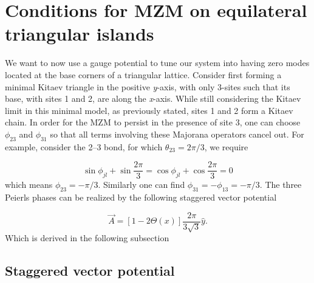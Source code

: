 \section{Conditions for MZM on equilateral triangular islands}


We want to now use a gauge potential to tune our system into having zero modes located at the base corners of a triangular lattice.
Consider first forming a minimal Kitaev triangle in the positive \textit{y}-axis, with only 3-sites such that its base, with sites 1 and 2, are along the \textit{x}-axis.
While still considering the Kitaev limit in this minimal model, as previously stated, sites 1 and 2 form a Kitaev chain.
In order for the MZM to persist in the presence of site 3, one can choose $\phi_{23}$ and $\phi_{31}$ so that all terms involving these Majorana operators cancel out.
For example, consider the 2--3 bond, for which $\theta_{23} = 2\pi/3$, we require

\begin{equation}
  \sin\phi_{jl} + \sin\dfrac{2\pi}{3} = \cos\phi_{jl} + \cos\dfrac{2\pi}{3} = 0
\end{equation}
which means $\phi_{23} = -\pi/3$.
Similarly one can find $\phi_{31} = -\phi_{13} = -\pi/3$.
The three Peierls phases can be realized by the following staggered vector potential

\begin{equation}\label{eq:Heaviside-vector-potential}
  \vec{A} = [1-2\Theta(x)] \dfrac{2\pi}{3\sqrt{3}}\hat{y}.
\end{equation}
Which is derived in the following subsection

\subsection{Staggered vector potential}

